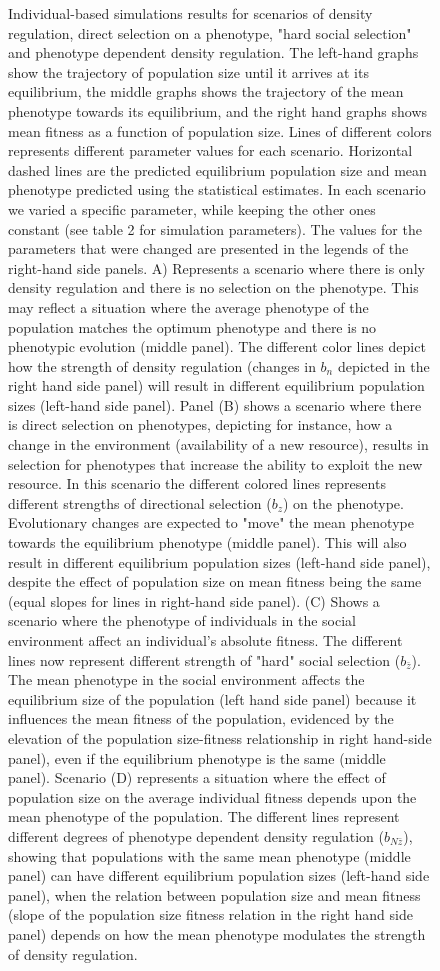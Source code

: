 \documentclass{article}
\begin{document}
\begin{figure}[ht]
	\caption{Individual-based simulations results for scenarios of density regulation, direct selection on a phenotype, "hard social selection" and phenotype dependent density regulation. The left-hand graphs show the trajectory of population size until it arrives at its equilibrium, the middle graphs shows the trajectory of the mean phenotype towards its equilibrium, and the right hand graphs shows mean fitness as a function of population size. Lines of different colors represents different parameter values for each scenario. Horizontal dashed lines are the predicted equilibrium population size and mean phenotype predicted using the statistical estimates. In each scenario we varied a specific parameter, while keeping the other ones constant (see table 2 for simulation parameters). The values for the parameters that were changed are presented in the legends of the right-hand side panels. A) Represents a scenario where there is only density regulation and there is no selection on the phenotype. This may reflect a situation where the average phenotype of the population matches the optimum phenotype and there is no phenotypic evolution (middle panel). The different color lines depict how the strength of density regulation (changes in $b_n$ depicted in the right hand side panel) will result in different equilibrium population sizes (left-hand side panel). Panel (B) shows a scenario where there is direct selection on phenotypes, depicting for instance, how a change in the environment (availability of a new resource), results in selection for phenotypes that increase the ability to exploit the new resource. In this scenario the different colored lines represents different strengths of directional selection ($b_z$) on the phenotype. Evolutionary changes are expected to "move" the mean phenotype towards the equilibrium phenotype (middle panel). This will also result in different equilibrium population sizes (left-hand side panel), despite the effect of population size on mean fitness being the same (equal slopes for lines in right-hand side panel). (C) Shows a scenario where the phenotype of individuals in the social environment affect an individual's absolute fitness. The different lines now represent different strength of "hard" social selection ($b_{\bar{z}}$).  The mean phenotype in the social environment affects the equilibrium size of the population (left hand side panel) because it influences the mean fitness of the population, evidenced by the elevation of the population size-fitness relationship in right hand-side panel), even if the equilibrium phenotype is the same (middle panel). Scenario (D) represents a situation where the effect of population size on the average individual fitness depends upon the mean phenotype of the population. The different lines represent different degrees of phenotype dependent density regulation ($b_{N\bar{z}}$), showing that populations with the same mean phenotype (middle panel) can have different equilibrium population sizes (left-hand side panel), when the relation between population size and mean fitness (slope of the population size fitness relation in the right hand side panel) depends on how the mean phenotype modulates the strength of density regulation.}
	\label{fig:sim2}
\end{figure}
\end{document}
